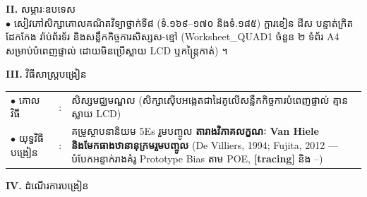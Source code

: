 \documentclass[a4paper,10pt]{article}
\newcommand{\en}[1]{{\TimesEn #1}}
\newcommand{\cnum}[1]{{\fontsize{10.5pt}{12pt}\selectfont\ding{\numexpr171+#1\relax}}\hspace{0.2em}}
\begin{document}
{\vspace{1pt}

\textbf{II.} {\muol សម្ភារៈឧបទេស}\\[1pt]
\hspace*{0.55cm}$\bullet$ \hspace{0.35cm} សៀវភៅសិក្សាគោលគណិតវិទ្យាថ្នាក់ទី៨ (ទំ.១៦៩--១៧០ និងទំ.១៨៥) ក្ដារខៀន ដីស បន្ទាត់ក្រិត ដែកកែង រ៉ាប់ព័រទ័រ និងសន្លឹកកិច្ចការសិស្សស-ខ្មៅ (\en{Worksheet\_QUAD1} ចំនួន ២ ទំព័រ \en{A4} សម្រាប់បំពេញផ្ទាល់ ដោយមិនប្រើស្លាយ \en{LCD} ឬកន្ត្រៃកាត់) ។

\vspace{1pt}

\textbf{III.} {\muol វិធីសាស្រ្តបង្រៀន}\\[1pt]
\hspace*{0.45cm}%
\begin{tabular}{@{}l l L{14.85cm}@{}}
  $\bullet$ \hspace{0.25cm} គោលវិធី & : & សិស្សមជ្ឈមណ្ឌល (សិក្សាស៊ើបអង្កេតជាដៃគូលើសន្លឹកកិច្ចការបំពេញផ្ទាល់ គ្មានស្លាយ \en{LCD}) \\
  $\bullet$ \hspace{0.25cm} យុទ្ធវិធីបង្រៀន & : & គម្រូស្ថាបនានិយម \en{5Es} រួមបញ្ចូល \textbf{តារាងវិភាគលក្ខណៈ \en{Van Hiele} និងមែកធាងឋានានុក្រមរួមបញ្ចូល} (\en{De Villiers, 1994; Fujita, 2012} — បំបែកអន្ទាក់រាងគំរូ \en{Prototype Bias} តាម \en{POE}, \textbf{[tracing]} និង \cnum{1}--\cnum{5}) \\
\end{tabular}
}

\vspace{1pt}

\textbf{IV.} {\muol ដំណើរការបង្រៀន}

\vspace{1pt}
\end{document}

